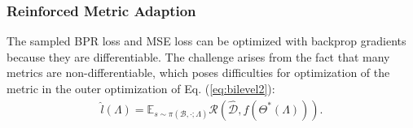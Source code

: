\subsubsection{Reinforced Metric Adaption}
The sampled BPR loss and MSE loss can be optimized with backprop gradients~\cite{amari1993backpropagation} because they are differentiable. The challenge arises from the fact that many metrics are non-differentiable, which poses difficulties for optimization of the metric in the outer optimization of Eq. (\ref{eq:bilevel2}):
\begin{equation}
    \begin{aligned}
        \hat{l}(\Lambda)=\mathbb{E}_{s \sim \pi(\mathcal{B},\cdot;{\Lambda})} \mathcal{R}(\hat{\mathcal{D}}, f(\Theta^*(\Lambda))).
    \end{aligned}
    \end{equation}

